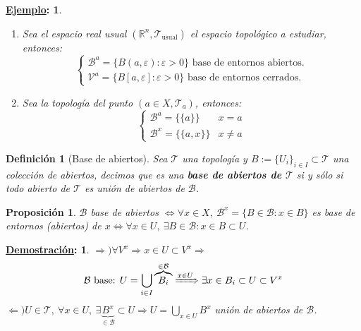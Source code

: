 \documentclass[10pt,a4paper,openright]{book}
\theoremstyle{break}
\newtheorem*{defi}{Definición}
\newtheorem*{prop}{Proposición}
\newtheorem*{demo}{\underline{Demostración}:}
\newtheorem*{ej}{\underline{Ejemplo}:}
\begin{document}
\begin{ej}
\begin{enumerate}
    \item Sea el espacio real usual $(\mathbb{R}^n, \mathcal{T}_{\text{usual}})$ el espacio topológico a estudiar, entonces:
    $$
    \begin{cases}
    \mathcal{B}^a = \{B\left( a, \varepsilon \right): \varepsilon > 0\} \text{ base de entornos abiertos.}  \\
    \mathcal{V}^a = \{B\left[ a, \varepsilon \right]: \varepsilon > 0\} \text{ base de entornos cerrados.} 
    \end{cases} 
    $$
    \item Sea la topología del punto $(a \in X, \mathcal{T}_a)$, entonces:
	$$
	\begin{cases}
	\mathcal{B}^a = \{\{a\}\} & x = a\\
	\mathcal{B}^x = \{\{a, x\}\} & x \neq a
	\end{cases}
	$$
\end{enumerate}
\end{ej}

\begin{defi}[Base de abiertos]
Sea $\mathcal{T}$ una topología y $B:=\{U_i\}_{i\in I}\subset \mathcal{T}$ una colección de abiertos, decimos que es una \textbf{base de abiertos de $\mathcal{T}$} si y sólo si todo abierto de $\mathcal{T}$ es unión de abiertos de $\mathcal{B}$.
\end{defi}

\begin{prop}

$\mathcal{B}$ base de abiertos $\Leftrightarrow \forall x \in X,\ \mathcal{B}^x = \{B \in \mathcal{B} : x \in B\}$ es base de entornos (abiertos) de $x \Leftrightarrow \forall x \in U,\ \exists B \in \mathcal{B} : x \in B \subset U$.
\end{prop}
\begin{demo}
$\Rightarrow) \forall V^x \Rightarrow x \in U \subset V^x \Rightarrow$
\[
    \mathcal{B} \text{ base: } U = \bigcup_{i \in  I} \overbrace{B_i}^{\in \mathcal{B}} \xRightarrow{x \in U} \exists x \in B_i \subset U \subset V^x
\]
$\Leftarrow) U \in \mathcal{T},\ \forall x \in U,\ \exists \underbrace{B^x}_{\in \mathcal{B}} \subset U \Rightarrow U = \bigcup_{x \in U} B^x$ unión de abiertos de $\mathcal{B}$.
\end{demo}
\end{document}
